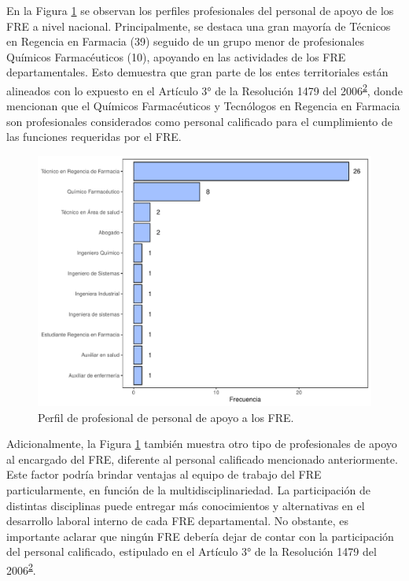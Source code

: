 \documentclass[
]{book}
\begin{document}
En la Figura \ref{fig:perfilProfesional2} se observan los perfiles profesionales del personal de apoyo de los FRE a nivel nacional. Principalmente, se destaca una gran mayoría de Técnicos en Regencia en Farmacia (39) seguido de un grupo menor de profesionales Químicos Farmacéuticos (10), apoyando en las actividades de los FRE departamentales. Esto demuestra que gran parte de los entes territoriales están alineados con lo expuesto en el Artículo 3° de la Resolución 1479 del 2006\textsuperscript{\protect\hyperlink{ref-MSPS1479-2006}{2}}, donde mencionan que el Químicos Farmacéuticos y Tecnólogos en Regencia en Farmacia son profesionales considerados como personal calificado para el cumplimiento de las funciones requeridas por el FRE.

\begin{figure}[t!]

{\centering \includegraphics[width=0.9\linewidth]{InformeFinal_files/figure-latex/perfilProfesional2-1} 

}

\caption{Perfil de profesional de personal de apoyo a los FRE.}\label{fig:perfilProfesional2}
\end{figure}

Adicionalmente, la Figura \ref{fig:perfilProfesional2} también muestra otro tipo de profesionales de apoyo al encargado del FRE, diferente al personal calificado mencionado anteriormente. Este factor podría brindar ventajas al equipo de trabajo del FRE particularmente, en función de la multidisciplinariedad. La participación de distintas disciplinas puede entregar más conocimientos y alternativas en el desarrollo laboral interno de cada FRE departamental. No obstante, es importante aclarar que ningún FRE debería dejar de contar con la participación del personal calificado, estipulado en el Artículo 3° de la Resolución 1479 del 2006\textsuperscript{\protect\hyperlink{ref-MSPS1479-2006}{2}}.
\end{document}
